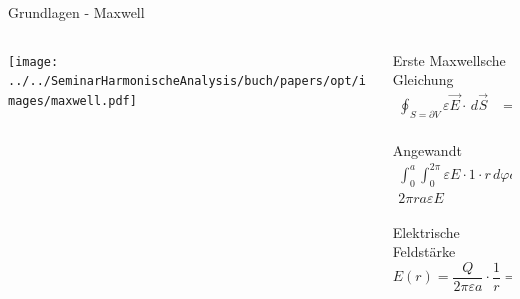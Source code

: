 \begin{frame}{Grundlagen - Maxwell}
    \begin{columns}
        \begin{column}{0.5\textwidth}
            \begin{center}
                \texttt{[image: ../../SeminarHarmonischeAnalysis/buch/papers/opt/images/maxwell.pdf]}
            \end{center}
        \end{column}

        \begin{column}{0.5\textwidth}
            \begin{block}{Erste Maxwellsche Gleichung}
                \begin{align*}
                    \oint_{S=\partial V} \varepsilon\vec{E} \cdot\, d\vec{S}
                    &=
                    \int_{V}\rho\, dV
                    \\
                \end{align*}
            \end{block}
            \pause
            \begin{block}{Angewandt}
                \begin{align*}
                    \int_{0}^{a}\int_{0}^{2\pi} \varepsilon E\cdot 1 \cdot r\, d\varphi dl
                    &=
                    Q
                    \\
                    2\pi ra\varepsilon E
                    &=
                    Q
                \end{align*}
            \end{block}
            \pause
            \begin{exampleblock}{Elektrische Feldstärke}
                \begin{equation*}
                    E(r)
                    =
                    \frac{Q}{2\pi\varepsilon a} \cdot \frac{1}{r}
                    =
                    C \cdot \frac{1}{r}
                \end{equation*}
            \end{exampleblock}
        \end{column}
    \end{columns}
\end{frame}
